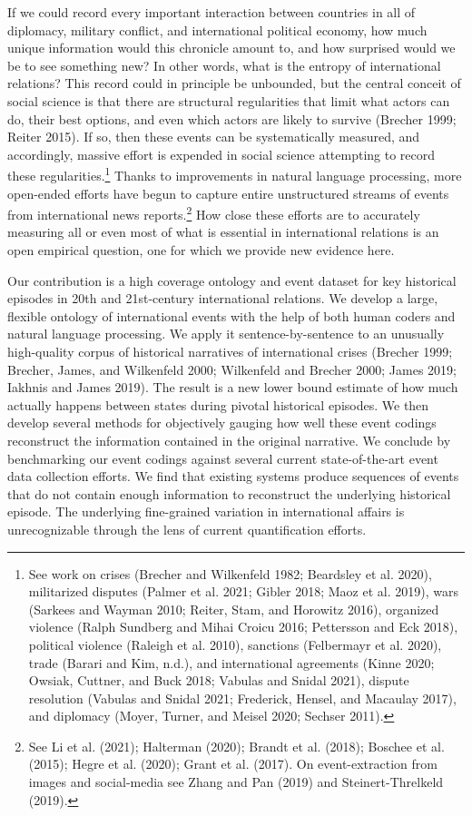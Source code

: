 \documentclass{article}
\begin{document}
If we could record every important interaction between countries in all
of diplomacy, military conflict, and international political economy,
how much unique information would this chronicle amount to, and how
surprised would we be to see something new? In other words, what is the
entropy of international relations? This record could in principle be
unbounded, but the central conceit of social science is that there are
structural regularities that limit what actors can do, their best
options, and even which actors are likely to survive (Brecher 1999;
Reiter 2015). If so, then these events can be systematically measured,
and accordingly, massive effort is expended in social science attempting
to record these regularities.\footnote{See work on crises (Brecher and
  Wilkenfeld 1982; Beardsley et al. 2020), militarized disputes (Palmer
  et al. 2021; Gibler 2018; Maoz et al. 2019), wars (Sarkees and Wayman
  2010; Reiter, Stam, and Horowitz 2016), organized violence (Ralph
  Sundberg and Mihai Croicu 2016; Pettersson and Eck 2018), political
  violence (Raleigh et al. 2010), sanctions (Felbermayr et al. 2020),
  trade (Barari and Kim, n.d.), and international agreements (Kinne
  2020; Owsiak, Cuttner, and Buck 2018; Vabulas and Snidal 2021),
  dispute resolution (Vabulas and Snidal 2021; Frederick, Hensel, and
  Macaulay 2017), and diplomacy (Moyer, Turner, and Meisel 2020; Sechser
  2011).} Thanks to improvements in natural language processing, more
open-ended efforts have begun to capture entire unstructured streams of
events from international news reports.\footnote{See Li et al. (2021);
  Halterman (2020); Brandt et al. (2018); Boschee et al. (2015); Hegre
  et al. (2020); Grant et al. (2017). On event-extraction from images
  and social-media see Zhang and Pan (2019) and Steinert-Threlkeld
  (2019).} How close these efforts are to accurately measuring all or
even most of what is essential in international relations is an open
empirical question, one for which we provide new evidence here.

Our contribution is a high coverage ontology and event dataset for key
historical episodes in 20th and 21st-century international relations. We
develop a large, flexible ontology of international events with the help
of both human coders and natural language processing. We apply it
sentence-by-sentence to an unusually high-quality corpus of historical
narratives of international crises (Brecher 1999; Brecher, James, and
Wilkenfeld 2000; Wilkenfeld and Brecher 2000; James 2019; Iakhnis and
James 2019). The result is a new lower bound estimate of how much
actually happens between states during pivotal historical episodes. We
then develop several methods for objectively gauging how well these
event codings reconstruct the information contained in the original
narrative. We conclude by benchmarking our event codings against several
current state-of-the-art event data collection efforts. We find that
existing systems produce sequences of events that do not contain enough
information to reconstruct the underlying historical episode. The
underlying fine-grained variation in international affairs is
unrecognizable through the lens of current quantification efforts.
\end{document}
